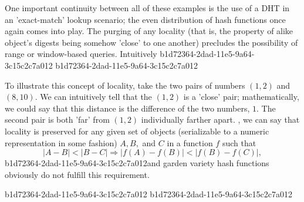\documentclass[12pt]{article}
\begin{document}
\par One important continuity between all of these examples is the use of a DHT in an 'exact-match' lookup scenario; the even distribution of hash functions once again comes into play. The purging of any locality (that is, the property of alike object's digests being somehow 'close' to one another) precludes the possibility of range or window-based queries. Intuitively
b1d72364-2dad-11e5-9a64-3c15c2c7a012
b1d72364-2dad-11e5-9a64-3c15c2c7a012\par To illustrate this concept of locality, take the two pairs of numbers $(1,2)$ and $(8,10)$. We can intuitively tell that the $(1,2)$ is a 'close' pair; mathematically, we could say that this distance is the difference of the two numbers, $1$. The second pair is both 'far' from $(1,2)$ individually farther apart. , we can say that locality is preserved for any given set of objects (serializable to a numeric representation in some fashion) $A,B,$ and $C$ in a function $f$ such that
\begin{equation}
|A-B| < |B-C| \Rightarrow |f(A)-f(B)| < |f(B) - f(C)|,
\end{equation}
b1d72364-2dad-11e5-9a64-3c15c2c7a012and garden variety hash functions obviously do not fulfill this requirement.

b1d72364-2dad-11e5-9a64-3c15c2c7a012\printbibliography
b1d72364-2dad-11e5-9a64-3c15c2c7a012
\end{document}
